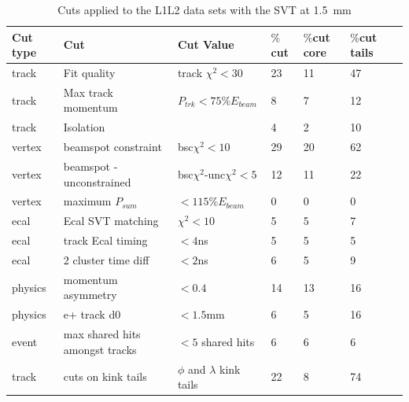\begin{table}[H]
\caption{Cuts applied to the L1L2 data sets with the SVT at 1.5~mm}
\label{l1l2_cuts_1p5}
\centering
\begin{tabular}{lllllll}
\toprule
Cut type & Cut & Cut Value &  $\%$cut &  $\%$cut core & $\%$cut tails\\
\midrule
track & Fit quality & track $\chi^{2}<30$ & 23 & 11 & 47 \\
track & Max track momentum &  $P_{trk}<75\%E_{beam}$ & 8 & 7 & 12 \\
track & Isolation &   & 4 & 2 & 10 \\
vertex & beamspot constraint & bsc$\chi^{2}<10$  & 29 & 20 & 62 \\
vertex & beamspot - unconstrained & bsc$\chi^{2}$-unc$\chi^2<5$  & 12 & 11 & 22 \\
vertex & maximum $P_{sum}$ &  $<115\%E_{beam}$ & 0 & 0 & 0 \\
ecal & Ecal SVT matching & $\chi^2<10$  & 5 & 5 & 7 \\
ecal & track Ecal timing & $<4$ns  & 5 & 5 & 5 \\
ecal & 2 cluster time diff & $<2$ns  & 6 & 5 & 9 \\
physics & momentum asymmetry & $<0.4$  & 14 & 13 & 16 \\
physics & e+ track d0 & $<1.5$mm  & 6 & 5 & 16 \\
event & max shared hits amongst tracks & $<5$ shared hits  & 6 & 6 & 6 \\
track & cuts on kink tails & $\phi$ and $\lambda$ kink tails & 22 & 8 & 74 \\
\bottomrule
\end{tabular}
\end{table}
